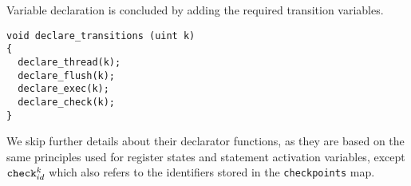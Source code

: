 \noindent
Variable declaration is concluded by adding the required transition variables.

\begin{lstlisting}[style=c++]
void declare_transitions (uint k)
{
  declare_thread(k);
  declare_flush(k);
  declare_exec(k);
  declare_check(k);
}
\end{lstlisting}



\noindent
We skip further details about their declarator functions, as they are based on the same principles used for register states and statement activation variables, except $\texttt{check}^k_{id}$ which also refers to the identifiers stored in the \texttt{checkpoints} map.

%

